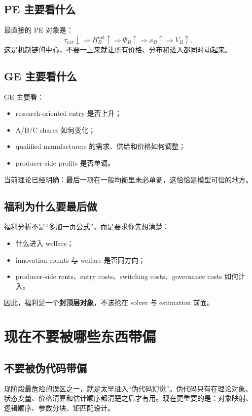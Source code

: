 \documentclass[12pt]{ctexart}
\newcommand{\tauext}{\tau_{ext}}
\begin{document}
\subsection{PE 主要看什么}
最直接的 PE 对象是：
\[
\tauext\downarrow
\Rightarrow H_B^{ext}\uparrow
\Rightarrow \Psi_B\uparrow
\Rightarrow x_B\uparrow
\Rightarrow V_B\uparrow.
\]
这是机制链的中心，不要一上来就让所有价格、分布和进入都同时动起来。

\subsection{GE 主要看什么}
GE 主要看：
\begin{itemize}[leftmargin=2em]
    \item research-oriented entry 是否上升；
    \item A/B/C shares 如何变化；
    \item qualified manufacturers 的需求、供给和价格如何调整；
    \item producer-side profits 是否单调。
\end{itemize}
当前理论已经明确：最后一项在一般均衡里未必单调，这恰恰是模型可信的地方。

\subsection{福利为什么要最后做}
福利分析不是“多加一页公式”，而是要求你先想清楚：
\begin{itemize}[leftmargin=2em]
    \item 什么进入 welfare；
    \item innovation counts 与 welfare 是否同方向；
    \item producer-side rents、entry costs、switching costs、governance costs 如何计入。
\end{itemize}
因此，福利是一个\textbf{封顶层对象}，不该抢在 solver 与 estimation 前面。

\section{现在不要被哪些东西带偏}

\subsection{不要被伪代码带偏}
现阶段最危险的误区之一，就是太早进入“伪代码幻觉”。伪代码只有在理论对象、状态变量、价格清算和估计顺序都清楚之后才有用。现在更重要的是：对象映射、逻辑顺序、参数分块、矩匹配设计。
\end{document}
